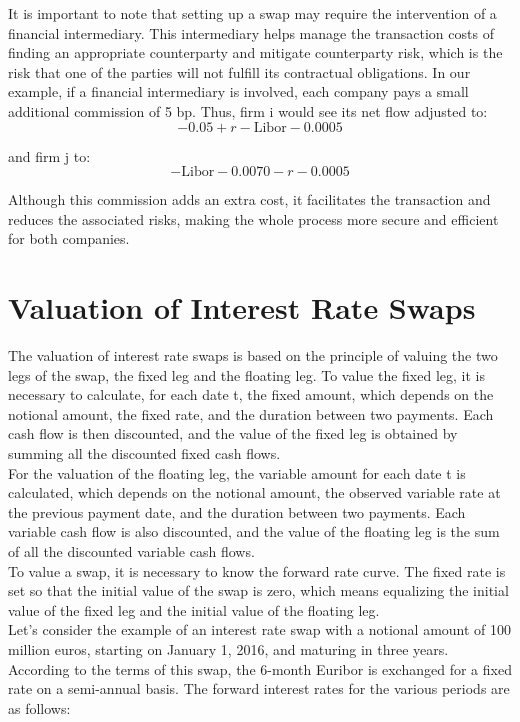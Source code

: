 \documentclass[a4paper,10pt]{article}
\begin{document}
        \noindent It is important to note that setting up a swap may require the intervention of a financial intermediary. This intermediary helps manage the transaction costs of finding an appropriate counterparty and mitigate counterparty risk, which is the risk that one of the parties will not fulfill its contractual obligations. In our example, if a financial intermediary is involved, each company pays a small additional commission of 5 bp. Thus, firm i would see its net flow adjusted to:
        \[-0.05 + r - \text{Libor} - 0.0005\]
        
        \noindent and firm j to:
        \[-\text{Libor} - 0.0070 - r - 0.0005\]
        
        \noindent Although this commission adds an extra cost, it facilitates the transaction and reduces the associated risks, making the whole process more secure and efficient for both companies.
    
    \section*{Valuation of Interest Rate Swaps}
    
        \noindent The valuation of interest rate swaps is based on the principle of valuing the two legs of the swap, the fixed leg and the floating leg. To value the fixed leg, it is necessary to calculate, for each date t, the fixed amount, which depends on the notional amount, the fixed rate, and the duration between two payments. Each cash flow is then discounted, and the value of the fixed leg is obtained by summing all the discounted fixed cash flows.\\
        
        \noindent For the valuation of the floating leg, the variable amount for each date t is calculated, which depends on the notional amount, the observed variable rate at the previous payment date, and the duration between two payments. Each variable cash flow is also discounted, and the value of the floating leg is the sum of all the discounted variable cash flows.\\
        
        \noindent To value a swap, it is necessary to know the forward rate curve. The fixed rate is set so that the initial value of the swap is zero, which means equalizing the initial value of the fixed leg and the initial value of the floating leg.\\
        
        \noindent Let’s consider the example of an interest rate swap with a notional amount of 100 million euros, starting on January 1, 2016, and maturing in three years. According to the terms of this swap, the 6-month Euribor is exchanged for a fixed rate on a semi-annual basis. The forward interest rates for the various periods are as follows:
        
\end{document}
